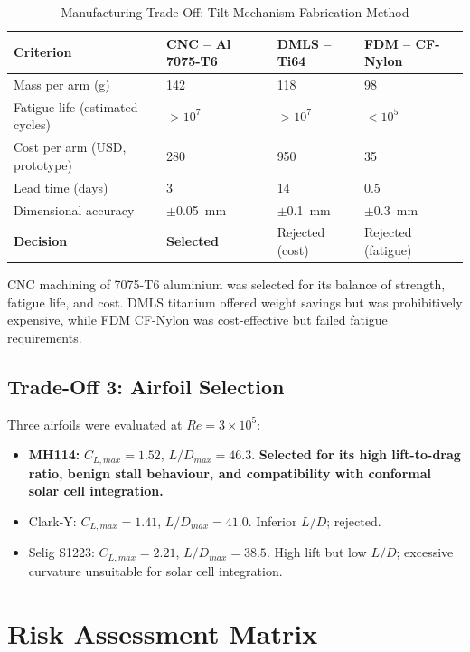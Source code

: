 \begin{table}[H]
\centering
\small
\caption{Manufacturing Trade-Off: Tilt Mechanism Fabrication Method}
\label{tab:tradeoff_mfg}
\begin{tabularx}{\textwidth}{X C{2.8cm} C{2.8cm} C{2.8cm}}
\toprule
\textbf{Criterion} & \textbf{CNC -- Al 7075-T6} & \textbf{DMLS -- Ti64} & \textbf{FDM -- CF-Nylon} \\
\midrule
Mass per arm (g) & 142 & 118 & 98 \\
Fatigue life (estimated cycles) & $> 10^7$ & $> 10^7$ & $< 10^5$ \\
Cost per arm (USD, prototype) & 280 & 950 & 35 \\
Lead time (days) & 3 & 14 & 0.5 \\
Dimensional accuracy & $\pm$0.05~mm & $\pm$0.1~mm & $\pm$0.3~mm \\
\textbf{Decision} & \textbf{Selected} & Rejected (cost) & Rejected (fatigue) \\
\bottomrule
\end{tabularx}
\end{table}

\noindent CNC machining of 7075-T6 aluminium was selected for its balance of strength, fatigue life, and cost. DMLS titanium offered weight savings but was prohibitively expensive, while FDM CF-Nylon was cost-effective but failed fatigue requirements.

\subsection{Trade-Off 3: Airfoil Selection}

Three airfoils were evaluated at $Re = 3 \times 10^5$:
\begin{itemize}[noitemsep]
    \item \textbf{MH114:} $C_{L,max} = 1.52$, $L/D_{max} = 46.3$. \textbf{Selected for its high lift-to-drag ratio, benign stall behaviour, and compatibility with conformal solar cell integration.}
    \item Clark-Y: $C_{L,max} = 1.41$, $L/D_{max} = 41.0$. Inferior $L/D$; rejected.
    \item Selig S1223: $C_{L,max} = 2.21$, $L/D_{max} = 38.5$. High lift but low $L/D$; excessive curvature unsuitable for solar cell integration.
\end{itemize}

\section{Risk Assessment Matrix}

